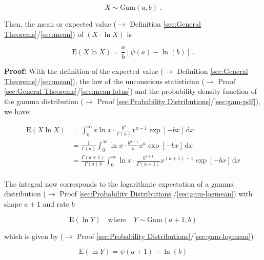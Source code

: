 \documentclass[a4paper,12pt,twoside]{book}
\begin{document}
\begin{equation} \label{eq:gam-xlogx-gam}
X \sim \mathrm{Gam}(a, b) \; .
\end{equation}

Then, the mean or expected value ($\rightarrow$ Definition \ref{sec:General Theorems}/\ref{sec:mean}) of $(X \cdot \ln X)$ is

\begin{equation} \label{eq:gam-xlogx-gam-xlogx}
\mathrm{E}(X \ln X) = \frac{a}{b} \left[ \psi(a) - \ln(b) \right] \; .
\end{equation}


\vspace{1em}
\textbf{Proof:} With the definition of the expected value ($\rightarrow$ Definition \ref{sec:General Theorems}/\ref{sec:mean}), the law of the unconscious statistician ($\rightarrow$ Proof \ref{sec:General Theorems}/\ref{sec:mean-lotus}) and the probability density function of the gamma distribution ($\rightarrow$ Proof \ref{sec:Probability Distributions}/\ref{sec:gam-pdf}), we have:

\begin{equation} \label{eq:gam-xlogx-gam-xlogx-s1}
\begin{split}
\mathrm{E}(X \ln X) &= \int_{0}^{\infty} x \ln x \cdot \frac{b^a}{\Gamma(a)} x^{a-1} \exp[-b x] \, \mathrm{d}x \\
&= \frac{1}{\Gamma(a)} \int_{0}^{\infty} \ln x \cdot \frac{b^{a+1}}{b} x^{a} \exp[-b x] \, \mathrm{d}x \\
&= \frac{\Gamma(a+1)}{\Gamma(a) \, b} \int_{0}^{\infty} \ln x \cdot \frac{b^{a+1}}{\Gamma(a+1)} x^{(a+1)-1} \exp[-b x] \, \mathrm{d}x \\
\end{split}
\end{equation}

The integral now corresponds to the logarithmic expectation of a gamma distribution ($\rightarrow$ Proof \ref{sec:Probability Distributions}/\ref{sec:gam-logmean}) with shape $a+1$ and rate $b$

\begin{equation} \label{eq:gam-xlogx-logmean-a+1}
\mathrm{E}(\ln Y) \quad \text{where} \quad Y \sim \mathrm{Gam}(a+1,b)
\end{equation}

which is given by ($\rightarrow$ Proof \ref{sec:Probability Distributions}/\ref{sec:gam-logmean})

\begin{equation} \label{eq:gam-xlogx-gam-logmean}
\mathrm{E}(\ln Y) = \psi(a+1) - \ln(b)
\end{equation}
\end{document}
